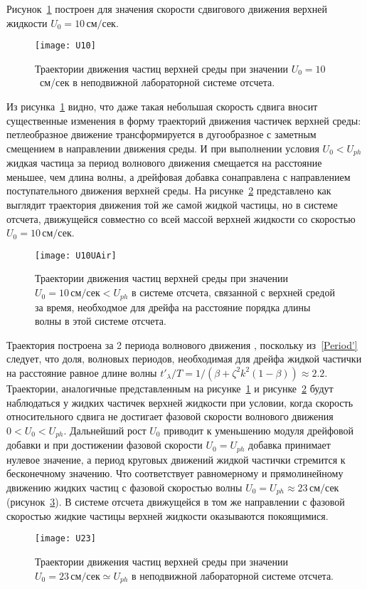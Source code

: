 Рисунок~\ref{fig:Traj3} построен для значения скорости сдвигового движения верхней жидкости $ U_{0}=10\, \text{см/сек} $. 
\begin{figure}[!h]
\centering
\texttt{[image: U10]}
\caption{Траектории движения частиц верхней среды при значении $ U_{0}=10 $~см/сек в неподвижной лабораторной системе отсчета.}\label{fig:Traj3}
\end{figure}
Из рисунка~\ref{fig:Traj3} видно, что даже такая небольшая скорость сдвига вносит существенные изменения в форму траекторий движения частичек верхней среды: петлеобразное движение трансформируется в дугообразное с заметным смещением в направлении движения среды. И при выполнении условия $ U_{0}<U_{ph} $ жидкая частица за период волнового движения смещается на расстояние меньшее, чем длина волны, а дрейфовая добавка сонаправлена с направлением поступательного движения верхней среды. На рисунке~\ref{fig:Traj4} представлено как выглядит траектория движения той же самой жидкой частицы, но в системе отсчета, движущейся совместно со всей массой верхней жидкости со скоростью $ U_{0}=10\, \text{см/сек} $. 
\begin{figure}[ht]
\centering
\texttt{[image: U10UAir]}
\caption{Траектории движения частиц верхней среды при значении $ U_{0}=10 \, \text{см/сек}<U_{ph}$ в системе отсчета, связанной с верхней средой за время, необходмое для дрейфа на расстояние порядка длины волны в этой системе отсчета.}\label{fig:Traj4}
\end{figure}
Траектория построена за 2 периода волнового движения , поскольку из~\eqref{Period'} следует, что доля, волновых периодов, необходимая для дрейфа жидкой частички на расстояние равное длине волны $ t'_{\lambda}/T=1/\left( \beta+\zeta^{2}k^{2}\left( 1-\beta \right) \right) \approx 2.2 $. Траектории, аналогичные представленным на рисунке~\ref{fig:Traj3} и рисунке~\ref{fig:Traj4} будут наблюдаться у жидких частичек верхней жидкости при условии, когда скорость относительного сдвига не достигает фазовой скорости волнового движения $ 0<U_{0}<U_{ph} $.
Дальнейший рост $ U_{0} $ приводит к уменьшению модуля дрейфовой добавки и при достижении фазовой скорости $ U_{0}=U_{ph} $ добавка принимает нулевое значение, а период круговых движений жидкой частички стремится к бесконечному значению. Что соответствует равномерному и прямолинейному движению жидких частиц с фазовой скоростью волны $ U_{0}=U_{ph}\approx 23 \, \text{см/сек} $ (рисунок~\ref{fig:Traj5}). В системе отсчета движущейся в том же направлении с фазовой скоростью жидкие частицы верхней жидкости оказываются покоящимися.
\begin{figure}[ht]
\centering
\texttt{[image: U23]}
\caption{Траектории движения частиц верхней среды при значении $ U_{0}=23\, \text{см/сек}\simeq U_{ph}$ в неподвижной лабораторной системе отсчета.}\label{fig:Traj5}
\end{figure}
 
